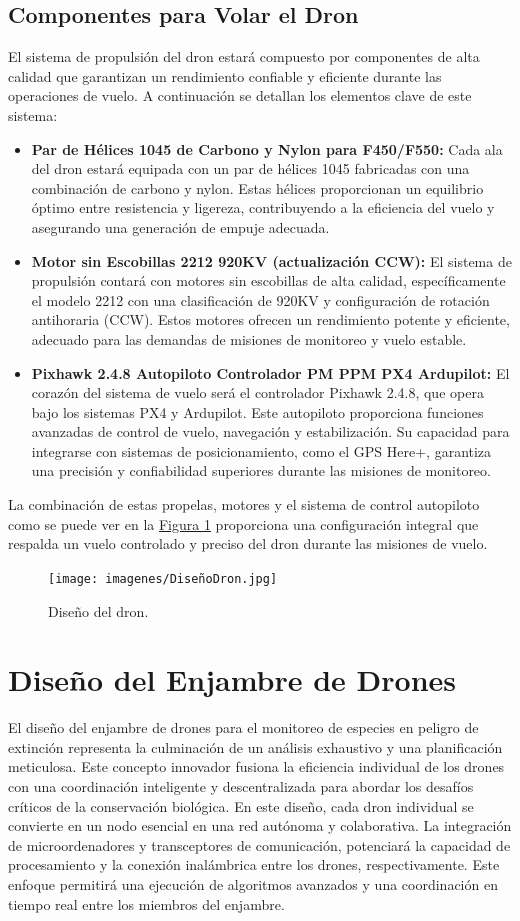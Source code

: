 \subsection{Componentes para Volar el Dron}
El sistema de propulsión del dron estará compuesto por componentes de alta calidad que garantizan un rendimiento confiable y eficiente durante las operaciones de vuelo. A continuación se detallan los elementos clave de este sistema:
\begin{itemize}
\item \textbf{Par de Hélices 1045 de Carbono y Nylon para F450/F550:} Cada ala del dron estará equipada con un par de hélices 1045 fabricadas con una combinación de carbono y nylon. Estas hélices proporcionan un equilibrio óptimo entre resistencia y ligereza, contribuyendo a la eficiencia del vuelo y asegurando una generación de empuje adecuada.
\item \textbf{Motor sin Escobillas 2212 920KV (actualización CCW):} El sistema de propulsión contará con motores sin escobillas de alta calidad, específicamente el modelo 2212 con una clasificación de 920KV y configuración de rotación antihoraria (CCW). Estos motores ofrecen un rendimiento potente y eficiente, adecuado para las demandas de misiones de monitoreo y vuelo estable.
\item \textbf{Pixhawk 2.4.8 Autopiloto Controlador PM PPM PX4 Ardupilot:} El corazón del sistema de vuelo será el controlador Pixhawk 2.4.8, que opera bajo los sistemas PX4 y Ardupilot. Este autopiloto proporciona funciones avanzadas de control de vuelo, navegación y estabilización. Su capacidad para integrarse con sistemas de posicionamiento, como el GPS Here+, garantiza una precisión y confiabilidad superiores durante las misiones de monitoreo.
\end{itemize}
La combinación de estas propelas, motores y el sistema de control autopiloto como se puede ver en la \hyperref[diseñodron]{Figura \ref{diseñodron}} proporciona una configuración integral que respalda un vuelo controlado y preciso del dron durante las misiones de vuelo.
\begin{figure}[H]
\centering
\texttt{[image: imagenes/DiseñoDron.jpg]}
\caption{Diseño del dron.}
\label{diseñodron}
\end{figure}

\newpage
\section{Diseño del Enjambre de Drones}
El diseño del enjambre de drones para el monitoreo de especies en peligro de extinción representa la culminación de un análisis exhaustivo y una planificación meticulosa. Este concepto innovador fusiona la eficiencia individual de los drones con una coordinación inteligente y descentralizada para abordar los desafíos críticos de la conservación biológica. En este diseño, cada dron individual se convierte en un nodo esencial en una red autónoma y colaborativa. La integración de microordenadores y transceptores de comunicación, potenciará la capacidad de procesamiento y la conexión inalámbrica entre los drones, respectivamente. Este enfoque permitirá una ejecución de algoritmos avanzados y una coordinación en tiempo real entre los miembros del enjambre.
